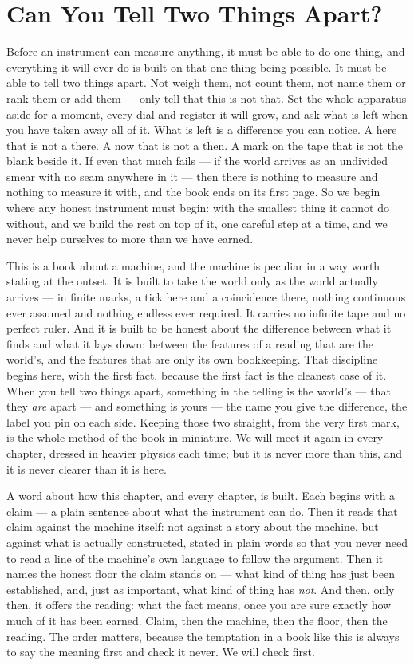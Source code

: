 \chapter{Can You Tell Two Things Apart?}

Before an instrument can measure anything, it must be able to do one thing, and everything it will ever do is
built on that one thing being possible. It must be able to tell two things apart. Not weigh them, not count
them, not name them or rank them or add them --- only tell that this is not that. Set the whole apparatus aside
for a moment, every dial and register it will grow, and ask what is left when you have taken away all of it.
What is left is a difference you can notice. A here that is not a there. A now that is not a then. A mark on the
tape that is not the blank beside it. If even that much fails --- if the world arrives as an undivided smear
with no seam anywhere in it --- then there is nothing to measure and nothing to measure it with, and the book
ends on its first page. So we begin where any honest instrument must begin: with the smallest thing it cannot do
without, and we build the rest on top of it, one careful step at a time, and we never help ourselves to more
than we have earned.

This is a book about a machine, and the machine is peculiar in a way worth stating at the outset. It is built to
take the world only as the world actually arrives --- in finite marks, a tick here and a coincidence there,
nothing continuous ever assumed and nothing endless ever required. It carries no infinite tape and no perfect
ruler. And it is built to be honest about the difference between what it finds and what it lays down: between the
features of a reading that are the world's, and the features that are only its own bookkeeping. That discipline
begins here, with the first fact, because the first fact is the cleanest case of it. When you tell two things
apart, something in the telling is the world's --- that they \emph{are} apart --- and something is yours --- the
name you give the difference, the label you pin on each side. Keeping those two straight, from the very first
mark, is the whole method of the book in miniature. We will meet it again in every chapter, dressed in heavier
physics each time; but it is never more than this, and it is never clearer than it is here.

A word about how this chapter, and every chapter, is built. Each begins with a claim --- a plain sentence about
what the instrument can do. Then it reads that claim against the machine itself: not against a story about the
machine, but against what is actually constructed, stated in plain words so that you never need to read a line
of the machine's own language to follow the argument. Then it names the honest floor the claim stands on --- what
kind of thing has just been established, and, just as important, what kind of thing has \emph{not}. And then,
only then, it offers the reading: what the fact means, once you are sure exactly how much of it has been earned.
Claim, then the machine, then the floor, then the reading. The order matters, because the temptation in a book
like this is always to say the meaning first and check it never. We will check first.

